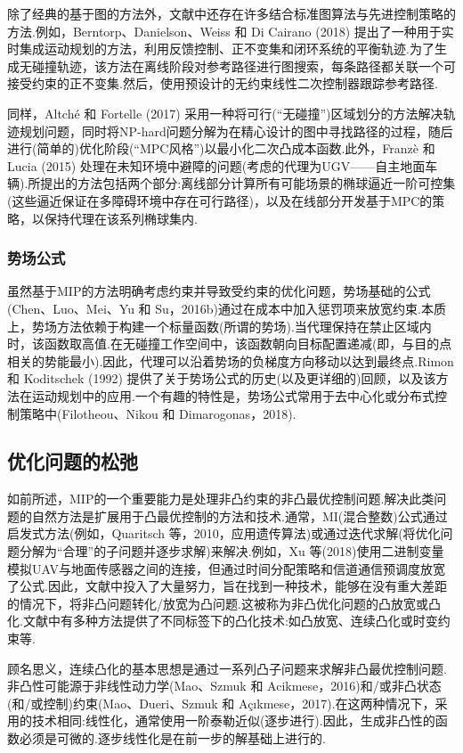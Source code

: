 \documentclass[10pt]{article}
\begin{document}
除了经典的基于图的方法外，文献中还存在许多结合标准图算法与先进控制策略的方法.例如，Berntorp、Danielson、Weiss 和 Di Cairano (2018) 提出了一种用于实时集成运动规划的方法，利用反馈控制、正不变集和闭环系统的平衡轨迹.为了生成无碰撞轨迹，该方法在离线阶段对参考路径进行图搜索，每条路径都关联一个可接受约束的正不变集.然后，使用预设计的无约束线性二次控制器跟踪参考路径.

同样，Altché 和 Fortelle (2017) 采用一种将可行(“无碰撞”)区域划分的方法解决轨迹规划问题，同时将NP-hard问题分解为在精心设计的图中寻找路径的过程，随后进行(简单的)优化阶段(“MPC风格”)以最小化二次凸成本函数.此外，Franzè 和 Lucia (2015) 处理在未知环境中避障的问题(考虑的代理为UGV——自主地面车辆).所提出的方法包括两个部分:离线部分计算所有可能场景的椭球逼近一阶可控集(这些逼近保证在多障碍环境中存在可行路径)，以及在线部分开发基于MPC的策略，以保持代理在该系列椭球集内.

\subsubsection{势场公式}

虽然基于MIP的方法明确考虑约束并导致受约束的优化问题，势场基础的公式(Chen、Luo、Mei、Yu 和 Su，2016b)通过在成本中加入惩罚项来放宽约束.本质上，势场方法依赖于构建一个标量函数(所谓的势场).当代理保持在禁止区域内时，该函数取高值.在无碰撞工作空间中，该函数朝向目标配置递减(即，与目的点相关的势能最小).因此，代理可以沿着势场的负梯度方向移动以达到最终点.Rimon 和 Koditschek (1992) 提供了关于势场公式的历史(以及更详细的)回顾，以及该方法在运动规划中的应用.一个有趣的特性是，势场公式常用于去中心化或分布式控制策略中(Filotheou、Nikou 和 Dimarogonas，2018).

\subsection{优化问题的松弛}

如前所述，MIP的一个重要能力是处理非凸约束的非凸最优控制问题.解决此类问题的自然方法是扩展用于凸最优控制的方法和技术.通常，MI(混合整数)公式通过启发式方法(例如，Quaritsch 等，2010，应用遗传算法)或通过迭代求解(将优化问题分解为“合理”的子问题并逐步求解)来解决.例如，Xu 等(2018)使用二进制变量模拟UAV与地面传感器之间的连接，但通过时间分配策略和信道通信预调度放宽了公式.因此，文献中投入了大量努力，旨在找到一种技术，能够在没有重大差距的情况下，将非凸问题转化/放宽为凸问题.这被称为非凸优化问题的凸放宽或凸化.文献中有多种方法提供了不同标签下的凸化技术:如凸放宽、连续凸化或时变约束等.

顾名思义，连续凸化的基本思想是通过一系列凸子问题来求解非凸最优控制问题.非凸性可能源于非线性动力学(Mao、Szmuk 和 Acikmese，2016)和/或非凸状态(和/或控制)约束(Mao、Dueri、Szmuk 和 Açıkmese，2017).在这两种情况下，采用的技术相同:线性化，通常使用一阶泰勒近似(逐步进行).因此，生成非凸性的函数必须是可微的.逐步线性化是在前一步的解基础上进行的.
\end{document}
